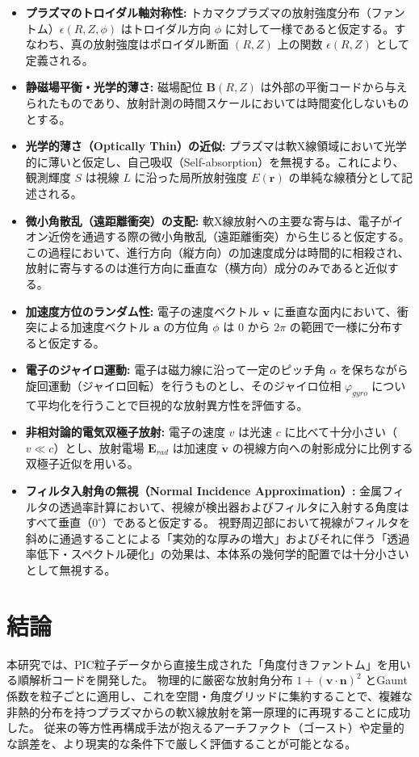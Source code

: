\documentclass[a4paper,11pt]{bxjsarticle} %
\begin{document}
\begin{itemize}
    \item \textbf{プラズマのトロイダル軸対称性:}
    トカマクプラズマの放射強度分布（ファントム）$\epsilon(R, Z, \phi)$ はトロイダル方向 $\phi$ に対して一様であると仮定する。すなわち、真の放射強度はポロイダル断面 $(R, Z)$ 上の関数 $\epsilon(R, Z)$ として定義される。
    \item \textbf{静磁場平衡・光学的薄さ:}
    磁場配位 $\mathbf{B}(R, Z)$ は外部の平衡コードから与えられたものであり、放射計測の時間スケールにおいては時間変化しないものとする。
    \item \textbf{光学的薄さ（Optically Thin）の近似:}
    プラズマは軟X線領域において光学的に薄いと仮定し、自己吸収（Self-absorption）を無視する。これにより、観測輝度 $S$ は視線 $L$ に沿った局所放射強度 $E(\mathbf{r})$ の単純な線積分として記述される。
    \item \textbf{微小角散乱（遠距離衝突）の支配:}
    軟X線放射への主要な寄与は、電子がイオン近傍を通過する際の微小角散乱（遠距離衝突）から生じると仮定する。この過程において、進行方向（縦方向）の加速度成分は時間的に相殺され、放射に寄与するのは進行方向に垂直な（横方向）成分のみであると近似する。
    \item \textbf{加速度方位のランダム性:}
    電子の速度ベクトル $\mathbf{v}$ に垂直な面内において、衝突による加速度ベクトル $\mathbf{a}$ の方位角 $\phi$ は $0$ から $2\pi$ の範囲で一様に分布すると仮定する。
    \item \textbf{電子のジャイロ運動:}
    電子は磁力線に沿って一定のピッチ角 $\alpha$ を保ちながら旋回運動（ジャイロ回転）を行うものとし、そのジャイロ位相 $\varphi_{gyro}$ について平均化を行うことで巨視的な放射異方性を評価する。
    \item \textbf{非相対論的電気双極子放射:}
    電子の速度 $v$ は光速 $c$ に比べて十分小さい（$v \ll c$）とし、放射電場 $\mathbf{E}_{rad}$ は加速度 $\dot{\mathbf{v}}$ の視線方向への射影成分に比例する双極子近似を用いる。
    \item \textbf{フィルタ入射角の無視（Normal Incidence Approximation）:}
    金属フィルタの透過率計算において、視線が検出器およびフィルタに入射する角度はすべて垂直（$0^{\circ}$）であると仮定する。
    視野周辺部において視線がフィルタを斜めに通過することによる「実効的な厚みの増大」およびそれに伴う「透過率低下・スペクトル硬化」の効果は、本体系の幾何学的配置では十分小さいとして無視する。
\end{itemize}

\section{結論}
本研究では、PIC粒子データから直接生成された「角度付きファントム」を用いる順解析コードを開発した。
物理的に厳密な放射角分布 $1+(\bm{v}\cdot\bm{n})^2$ とGaunt係数を粒子ごとに適用し、これを空間・角度グリッドに集約することで、複雑な非熱的分布を持つプラズマからの軟X線放射を第一原理的に再現することに成功した。
従来の等方性再構成手法が抱えるアーチファクト（ゴースト）や定量的な誤差を、より現実的な条件下で厳しく評価することが可能となる。
\end{document}
